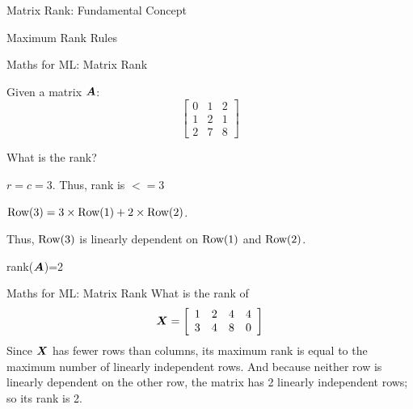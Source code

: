 \documentclass{beamer}
\begin{document}
\begin{frame}{Matrix Rank: Fundamental Concept}

\begin{examplebox}{Maximum Rank Rules}
\end{examplebox}

\end{frame}

\begin{frame}{Maths for ML: Matrix Rank}
\cleanitemize
{
    \item Given a matrix $\bm{A}$:$$
    \left[\begin{array}{lll}
    	{0} & {1} & {2} \\
    	{1} & {2} & {1} \\
    	{2} & {7} & {8}
    \end{array}\right]
    $$
    \item What is the rank?
    \item $r=c=3$. Thus, rank is $<=3$
    \item $\rm Row(3) = 3 \times \rm Row(1) + 2 \times \rm Row(2)$. 
    \item Thus, $\rm Row(3)$ is linearly dependent on $\rm Row(1)$ and $\rm Row(2)$.
    \item rank($\bm{A}$)=2
}
\end{frame}


\begin{frame}{Maths for ML: Matrix Rank}
What is the rank of
\begin{equation*}
\bm{X} =\left[\begin{array}{llll}
{1} & {2} & {4} & {4} \\
{3} & {4} & {8} & {0}
\end{array}\right]
\end{equation*}
\pause Since $\bm{X}$ has fewer rows than columns, its maximum rank is equal to the maximum number of linearly independent rows. And because neither row is linearly dependent on the other row, the matrix has 2 linearly independent rows; so its rank is 2.
\end{frame}
\end{document}
